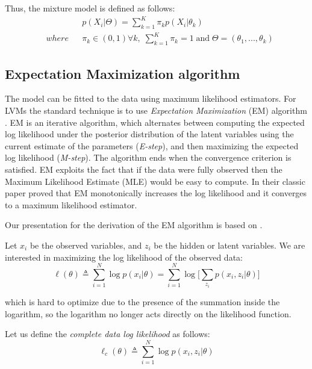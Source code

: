 Thus, the mixture model is defined as follows:
\begin{equation}
	\begin{aligned}
		& 
		& & p(X_{i}|\Theta) = \sum_{k=1}^{K}\pi_{k}p(X_{i}|\theta_{k}) \\
		& where 
		& & \pi_{k} \in (0, 1) \forall k, \; \sum_{k=1}^{K}\pi_{k} = 1  \; \text{and} \; \Theta = (\theta_{1},...,\theta_{k})
	\end{aligned}
\end{equation}

\subsection{Expectation Maximization algorithm}
The model can be fitted to the data using maximum likelihood estimators. For LVMs the standard technique is to use \emph{Expectation Maximization} (EM) algorithm \citep{Dempster1977}. EM is an iterative algorithm, which alternates between computing the expected log likelihood under the posterior distribution of the latent variables using the current estimate of the parameters (\emph{E-step}), and then maximizing the expected log likelihood (\emph{M-step}). The algorithm ends when the convergence criterion is satisfied. EM exploits the fact that if the data were fully observed then the Maximum Likelihood Estimate (MLE) would be easy to compute. In their classic paper \cite{Dempster1977} proved that EM monotonically increases the log likelihood and it converges to a maximum likelihood estimator. 

Our presentation for the derivation of the EM algorithm is based on \cite[Ch. \ 11]{Murphy2012}.

Let $x_{i}$ be the observed variables, and $z_{i}$ be the hidden or latent variables. We are interested in maximizing the log likelihood of the observed data:
\begin{equation} \label{log-lik-observed-f}
	\ell(\theta) \triangleq \sum_{i=1}^{N} \log p(x_{i}|\theta) =  \sum_{i=1}^{N} \log \bigg[\sum_{z_{i}} p(x_{i}, z_{i}|\theta) \bigg]
\end{equation}

which is hard to optimize due to the presence of the summation inside the logarithm, so the logarithm no longer acts directly on the likelihood function.

Let us define the \emph{complete data log likelihood} as follows:
\begin{equation} \label{log-lik-observed-f}
	\ell_{c}(\theta) \triangleq \sum_{i=1}^{N} \log p(x_{i}, z_{i}|\theta)
\end{equation}

